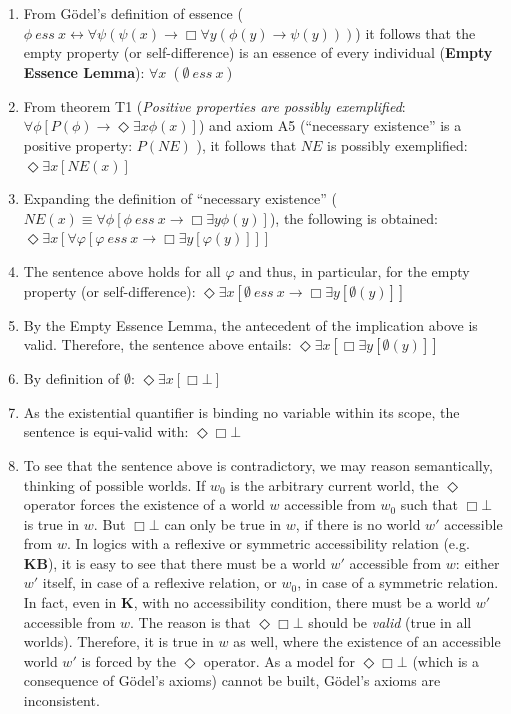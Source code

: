 \documentclass{llncs}
\newcommand{\logic}[1]{\textbf{#1}\xspace}
\newcommand{\KB}{\logic{KB}}
\newcommand{\K}{\logic{K}}
\newcommand{\imp}{{\rightarrow}}
\newcommand{\biimp}{\leftrightarrow}
\newcommand{\allq}{\forall}
\newcommand{\exq}{\exists}
\newcommand{\Dia}{\Diamond} %
\newcommand{\NE}{\mathit{NE}}
\newcommand{\ess}[2]{#1\ \mathit{ess}\ #2}
\newcommand{\nec}{\Box}
\newcommand{\pos}{\Dia}
\begin{document}
\begin{enumerate}
\item From G\"odel's definition of essence 
(${\ess{\phi}{x} \biimp {\allq \psi} (\psi(x)
\imp {\nec} \allq y (\phi(y) \imp \psi(y)))}$) it follows that the
empty property (or self-difference) is an essence of every individual
(\textbf{Empty Essence Lemma}): \hfill $\allq x\; (\ess{\emptyset}{x})$

\item From theorem T1 (\textit{Positive properties are possibly
  exemplified}: ${\allq \phi} [P(\phi) \imp {\pos}  \exq x
  \phi(x)]$) and axiom A5 (``necessary existence'' is a positive
  property: $P(\NE)$ ), it follows that $\NE$ is possibly exemplified:
  \hfill $  \pos \exq x [\NE(x)] $
 
\item Expanding the definition of ``necessary existence''
  (${\NE(x) \equiv \allq \phi [\ess{\phi}{x} \imp \nec \exq y
    \phi(y)]}$), the following is obtained: \hfill $  \pos \exq x
  [\allq \varphi [ \ess{\varphi}{x} \imp \nec \exq y [\varphi(y)] ] ] $

\item The sentence above holds for all $\varphi$ and thus, in
  particular, for the empty property (or self-difference): \hfill $\pos \exq x [ \ess{\emptyset}{x} \imp \nec \exq y [\emptyset(y)] ]$

\item By the Empty Essence Lemma, the antecedent of the implication
  above is valid. Therefore, the sentence above entails: \hfill $\pos \exq x [ \nec \exq y [\emptyset(y)] ]$ 

\item By definition of $\emptyset$: \hfill $\pos \exq x [ \nec \bot ]$

\item As the existential quantifier is binding no variable within its
  scope, the sentence is equi-valid with: \hfill $\pos \nec \bot $

\item To see that the sentence above is contradictory, we may reason semantically, thinking of possible worlds. If $w_0$ is the arbitrary current world, the $\pos$ operator forces the existence of a world $w$ accessible from $w_0$ such that $\nec \bot$ is true in $w$. But $\nec \bot$ can only be true in $w$, if there is no world $w'$ accessible from $w$. In logics with a reflexive or symmetric accessibility relation (e.g. \KB), it is easy to see that there must be a world $w'$ accessible from $w$: either $w'$ itself, in case of a reflexive relation, or $w_0$, in case of a symmetric relation. In fact, even in \K, with no accessibility condition, there must be a world $w'$ accessible from $w$. The reason is that $\pos \nec \bot$ should be \emph{valid} (true in all worlds). Therefore, it is true in $w$ as well, where the existence of an accessible world $w'$ is forced by the $\pos$ operator. As a model for $\pos \nec \bot$ (which is a consequence of G\"odel's axioms) cannot be built, G\"odel's axioms are inconsistent.
\end{enumerate}
\end{document}
